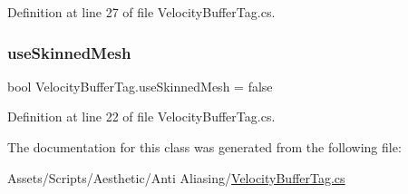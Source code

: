 Definition at line 27 of file Velocity\+Buffer\+Tag.\+cs.

\mbox{\label{class_velocity_buffer_tag_a2242c0bf56dce5a4e6c907d4e51df258}} 
\subsubsection{\texorpdfstring{use\+Skinned\+Mesh}{useSkinnedMesh}}
{\footnotesize\ttfamily bool Velocity\+Buffer\+Tag.\+use\+Skinned\+Mesh = false}



Definition at line 22 of file Velocity\+Buffer\+Tag.\+cs.



The documentation for this class was generated from the following file\+:\begin{DoxyCompactItemize}
\item 
Assets/\+Scripts/\+Aesthetic/\+Anti Aliasing/\mbox{\hyperlink{_velocity_buffer_tag_8cs}{Velocity\+Buffer\+Tag.\+cs}}\end{DoxyCompactItemize}
